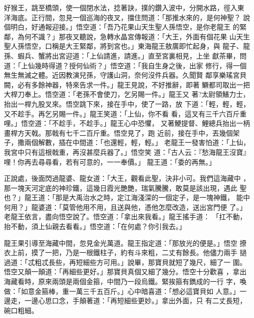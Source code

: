 \begin{pinyinscope}
{好猴王，跳至橋頭，使一個閉水法，捻著訣，撲的鑽入波中，分開水路，徑入東
洋海底。正行間，忽見一個巡海的夜叉，擋住問道：「那推水來的，是何神聖？
說個明白，好通報迎接。」悟空道：「吾乃花果山天生聖人孫悟空，是你老龍王
的緊鄰，為何不識？」那夜叉聽說，急轉水晶宮傳報道：「大王，外面有個花果
山天生聖人孫悟空，口稱是大王緊鄰，將到宮也。」東海龍王敖廣即忙起身，與
龍子、龍孫、蝦兵、蟹將出宮迎道：「上仙請進，請進。」直至宮裏相見，上坐
獻茶畢，問道：「上仙幾時得道？授何仙術？」悟空道：「我自生身之後，出家
修行，得一個無生無滅之體。近因教演兒孫，守護山洞，奈何沒件兵器。久聞賢
鄰享樂瑤宮貝闕，必有多餘神器，特來告求一件。」龍王見說，不好推辭，即著
鱖都司取出一把大桿刀奉上。悟空道：「老孫不會使刀，乞另賜一件。」龍王又
著?太尉領鱔力士，抬出一桿九股叉來。悟空跳下來，接在手中，使了一路，放
下道：「輕，輕，輕，又不趁手。再乞另賜一件。」龍王笑道：「上仙，你不看
看，這叉有三千六百斤重哩。」悟空道：「不趁手，不趁手。」龍王心中恐懼，
又著鯁提督、鯉總兵抬出一柄畫桿方天戟。那戟有七千二百斤重。悟空見了，跑
近前，接在手中，丟幾個架子，撒兩個解數，插在中間道：「也還輕，輕，輕。」
老龍王一發害怕道：「上仙，我宮中只有這根戟重，再沒甚麼兵器了。」悟空笑
道：「古人云：『愁海龍王沒寶』哩！你再去尋尋看，若有可意的，一一奉價。」
龍王道：「委的再無。」

正說處，後面閃過龍婆、龍女道：「大王，觀看此聖，決非小可。我們這海藏中
，那一塊天河定底的神珍鐵，這幾日霞光艷艷，瑞氣騰騰，敢莫是該出現，遇此
聖也？」龍王道：「那是大禹治水之時，定江海淺深的一個定子，是一塊神鐵，
能中何用？」龍婆道：「莫管他用不用，且送與他，憑他怎麼改造，送出宮門便
了。」老龍王依言，盡向悟空說了。悟空道：「拿出來我看。」龍王搖手道：
「扛不動，抬不動，須上仙親去看看。」悟空道：「在何處？你引我去。」

龍王果引導至海藏中間，忽見金光萬道。龍王指定道：「那放光的便是。」悟空
撩衣上前，摸了一把，乃是一根鐵柱子，約有斗來粗，二丈有餘長。他儘力兩手
撾過道：「忒粗忒長些，再短細些方可用。」說畢，那寶貝就短了幾尺，細了一
圍。悟空又顛一顛道：「再細些更好。」那寶貝真個又細了幾分。悟空十分歡喜
，拿出海藏看時，原來兩頭是兩個金箍，中間乃一段烏鐵。緊挨箍有鐫成的一行
字，喚做：「如意金箍棒，重一萬三千五百斤。」心中暗喜道：「想必這寶貝如
人意。」一邊走，一邊心思口念，手顛著道：「再短細些更妙。」拿出外面，只
有二丈長短，碗口粗細。

}
\end{pinyinscope}
